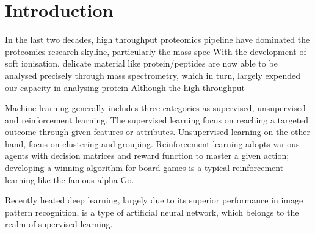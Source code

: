\section{Introduction}

In the last two decades, high throughput proteomics pipeline have dominated the proteomics research skyline, particularly the mass spec With the development of soft ionisation, delicate material like protein/peptides are now able to be analysed precisely through mass spectrometry, which in turn, largely expended our capacity in analysing protein Although the high-throughput   
\par 
Machine learning generally includes three categories as supervised, unsupervised and reinforcement learning. The supervised learning focus on reaching a targeted outcome through given features or attributes. Unsupervised learning on the other hand, focus on clustering and grouping. Reinforcement learning adopts various agents with decision matrices and reward function to master a given action; developing a winning algorithm for board games is a typical reinforcement learning like the famous alpha Go.
\par
Recently heated deep learning, largely due to its superior performance in image pattern recognition, is a type of artificial neural network, which belongs to the realm of supervised learning. 

